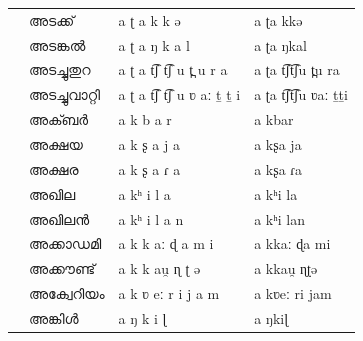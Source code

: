\begin{table}[htpb]
\begin{center}
\begin{tabular}{@{}p{1.5cm}p{2cm}p{2.7cm}p{2.9cm}@{}}
			\hline
			\multirow{4}{*}{\rotatebox{60}{Nouns}}        & {\mal അടക്ക്}    & {\ipa a ʈ a k k ə}              & {\ipa a ʈa kkə}           \\
			                                              & {\mal അടങ്കൽ}   & {\ipa a ʈ a ŋ k a l}            & {\ipa a ʈa ŋkal}          \\
			                                              & {\mal അടച്ചുതുറ}  & {\ipa a ʈ a t͡ʃ t͡ʃ u t̪ u r a}    & {\ipa a ʈa t͡ʃt͡ʃu t̪u ra}   \\
			                                              & {\mal അടച്ചുവാറ്റി} & {\ipa a ʈ a t͡ʃ t͡ʃ u ʋ aː ṯ ṯ i} & {\ipa a ʈa t͡ʃt͡ʃu ʋaː ṯṯi} \\
			\hline
			\multirow{4}{*}{\rotatebox{60}{Proper Nouns}} & {\mal അക്ബർ}    & {\ipa a k b a r}                & {\ipa a kbar}             \\
			                                              & {\mal അക്ഷയ}    & {\ipa a k ʂ a j a}              & {\ipa a kʂa ja}           \\
			                                              & {\mal അക്ഷര}    & {\ipa a k ʂ a ɾ a}              & {\ipa a kʂa ɾa}           \\
			                                              & {\mal അഖില}     & {\ipa a kʰ i l a}               & {\ipa a kʰi la}           \\
			                                              & {\mal അഖിലൻ}    & {\ipa a kʰ i l a n}             & {\ipa a kʰi lan}          \\
			\hline
			\multirow{4}{*}{\rotatebox{60}{Loan words}}   & {\mal അക്കാഡമി}   & {\ipa a k k aː ɖ a m i}         & {\ipa a kkaː ɖa mi}       \\
			                                              & {\mal അക്കൗണ്ട്}   & {\ipa a k k au̯ ɳ ʈ ə}           & {\ipa a kkau̯ ɳʈə}         \\
			                                              & {\mal അക്വേറിയം}   & {\ipa a k ʋ eː r i j a m}       & {\ipa a kʋeː ri jam}      \\
			                                              & {\mal അങ്കിൾ}    & {\ipa a ŋ k i ɭ}                & {\ipa a ŋkiɭ}             \\
			\hline
		\end{tabular}
	\end{center}
\end{table}



